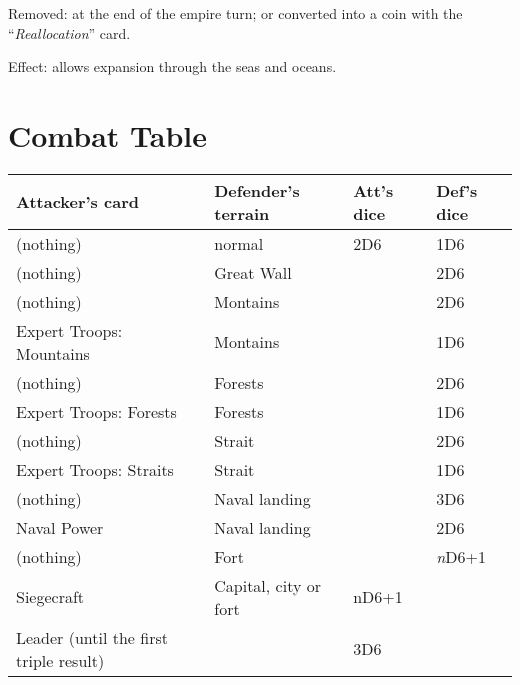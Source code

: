 \documentclass[a4paper,twocolumn]{article}
\newenvironment{texte}{\rmfamily\footnotesize}{}
\newcommand{\carte}[1]{``\textit{#1}''}
\begin{document}
\begin{texte}
      Removed: at the end of the empire turn; or converted into a coin
      with the \carte{Reallocation} card.

      Effect: allows expansion through the seas and oceans.

\section{Combat Table}

\begin{tabular}[t]{|p{20mm}|p{20mm}|p{12mm}|p{13mm}|}
\hline
       Attacker's card      & Defender's terrain  &  Att's dice          & Def's dice \\
\hline
      (nothing)             & normal              &         2D6          &       1D6         \\
\hline
      (nothing)             & Great Wall          &                      &       2D6         \\
\hline
      (nothing)             & Montains            &                      &       2D6         \\
\hline
Expert Troops: Mountains    & Montains            &                      &       1D6         \\
\hline
      (nothing)             & Forests             &                      &       2D6         \\
\hline
 Expert Troops: Forests     & Forests             &                      &       1D6         \\
\hline
      (nothing)             & Strait              &                      &       2D6         \\
\hline
 Expert Troops: Straits     & Strait              &                      &       1D6         \\
\hline
      (nothing)             & Naval landing       &                      &       3D6         \\
\hline
Naval Power                 & Naval landing       &                      &       2D6         \\
\hline
      (nothing)             & Fort                &                      & \textit{n}D6+1    \\
\hline
    Siegecraft              & Capital, city or
                                    fort          &        nD6+1         &                   \\
\hline
Leader (until the first
triple result)              &                     &         3D6          &                   \\

\end{tabular}
\end{texte}
\end{document}
